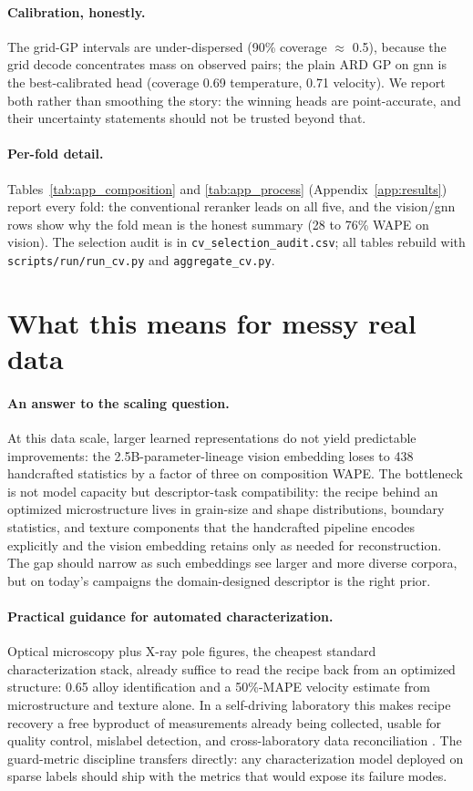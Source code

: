\documentclass{article}
\begin{document}
\paragraph{Calibration, honestly.} The grid-GP intervals are under-dispersed
(90\% coverage $\approx$ 0.5), because the grid decode concentrates mass on
observed pairs; the plain ARD GP on gnn is the best-calibrated head (coverage
0.69 temperature, 0.71 velocity). We report both rather than smoothing the
story: the winning heads are point-accurate, and their uncertainty statements
should not be trusted beyond that.

\paragraph{Per-fold detail.}
\label{sec:perfold}
Tables~\ref{tab:app_composition} and \ref{tab:app_process}
(Appendix~\ref{app:results}) report every fold: the conventional reranker
leads on all five, and the vision/gnn rows show why the fold mean is the
honest summary (28 to 76\% WAPE on vision). The selection audit is in
\texttt{cv\_selection\_audit.csv}; all tables rebuild with
\texttt{scripts/run/run\_cv.py} and \texttt{aggregate\_cv.py}.

\section{What this means for messy real data}
\label{sec:discussion}

\paragraph{An answer to the scaling question.} At this data scale, larger
learned representations do not yield predictable improvements: the
2.5B-parameter-lineage vision embedding loses to 438 handcrafted statistics by
a factor of three on composition WAPE. The bottleneck is not model capacity but
descriptor-task compatibility: the recipe behind an optimized microstructure
lives in grain-size and shape distributions, boundary statistics, and texture
components that the handcrafted pipeline encodes explicitly and the vision
embedding retains only as needed for reconstruction. The gap should narrow as
such embeddings see larger and more diverse corpora, but on today's
campaigns the domain-designed descriptor is the right prior.

\paragraph{Practical guidance for automated characterization.} Optical
microscopy plus X-ray pole figures, the cheapest standard characterization
stack, already suffice to read the recipe back from an optimized structure:
0.65 alloy identification and a 50\%-MAPE velocity estimate from microstructure
and texture alone. In a self-driving laboratory this makes recipe recovery a
free byproduct of measurements already being collected, usable for quality
control, mislabel detection, and cross-laboratory data reconciliation
\cite{low2025selfdriving}. The guard-metric discipline
transfers directly: any characterization model deployed on sparse labels should
ship with the metrics that would expose its failure modes.
\end{document}
